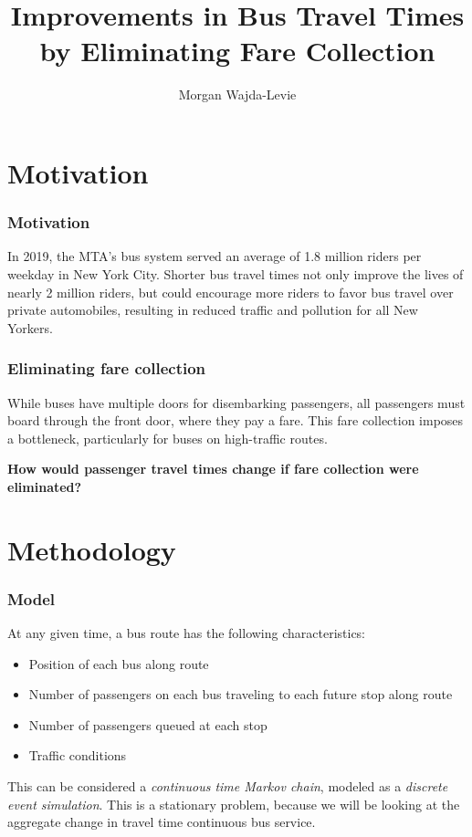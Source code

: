 \documentclass[xcolor=x11names,compress, 10pt]{beamer}
\renewcommand{\(}{\begin{columns}}
\renewcommand{\)}{\end{columns}}
\newcommand{\<}[1]{\begin{column}{#1}}
\renewcommand{\>}{\end{column}}
\begin{document}
\begin{frame}
\title{\bfseries Improvements in Bus Travel Times by Eliminating Fare
Collection}
\author{Morgan Wajda-Levie}


\titlepage
\end{frame}

\section{Motivation}
\begin{frame}
\frametitle{Motivation}

In 2019, the MTA's bus system served an average of 1.8 million riders
per weekday in New York City. Shorter bus travel times not only improve
the lives of nearly 2 million riders, but could encourage more riders to
favor bus travel over private automobiles, resulting in reduced traffic
and pollution for all New Yorkers.

\end{frame}

\begin{frame}
    \frametitle{Eliminating fare collection}

    While buses have multiple doors for disembarking passengers, all
    passengers must board through the front door, where they pay a fare.
    This fare collection imposes a bottleneck, particularly for buses on
    high-traffic routes.

    \medskip

    \textbf{How would passenger travel times change if fare collection
    were eliminated?}

\end{frame}

\section{Methodology}
\begin{frame}
\frametitle{Model}

    At any given time, a bus route has the following
    characteristics:
    \begin{itemize}
        \item Position of each bus along route
        \item Number of passengers on each bus traveling to each future
            stop along route
        \item Number of passengers queued at each stop
        \item Traffic conditions
    \end{itemize}

    This can be considered a \emph{continuous time Markov chain},
    modeled as a \emph{discrete event simulation}. This is a stationary
    problem, because we will be looking at the aggregate change in travel
    time continuous bus service.
\end{frame}
\end{document}
